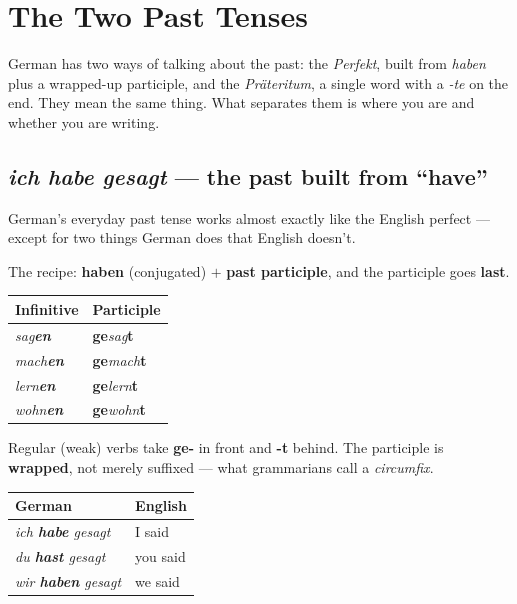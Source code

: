 \chapter{The Two Past Tenses}
\label{ch:perfekt}

German has two ways of talking about the past: the \emph{Perfekt}, built from
\emph{haben} plus a wrapped-up participle, and the \emph{Pr\"{a}teritum}, a
single word with a \emph{-te} on the end. They mean the same thing. What
separates them is where you are and whether you are writing.

\section{\emph{ich habe gesagt} --- the past built from ``have''}
\label{lesson:perfekt}

German's everyday past tense works almost exactly like the English perfect ---
except for two things German does that English doesn't.

\begin{morphologybox}
The recipe: \textbf{haben} (conjugated) $+$ \textbf{past participle}, and the
participle goes \textbf{last}.
\end{morphologybox}

\begin{center}
\begin{tabular}{@{}ll@{}}
\toprule
Infinitive & Participle \\
\midrule
\emph{sag\textbf{en}} & \textbf{ge}\emph{sag}\textbf{t} \\
\emph{mach\textbf{en}} & \textbf{ge}\emph{mach}\textbf{t} \\
\emph{lern\textbf{en}} & \textbf{ge}\emph{lern}\textbf{t} \\
\emph{wohn\textbf{en}} & \textbf{ge}\emph{wohn}\textbf{t} \\
\bottomrule
\end{tabular}
\end{center}

Regular (weak) verbs take \textbf{ge-} in front and \textbf{-t} behind. The
participle is \textbf{wrapped}, not merely suffixed --- what grammarians call a
\emph{circumfix}.

\begin{center}
\begin{tabular}{@{}ll@{}}
\toprule
German & English \\
\midrule
\emph{ich \textbf{habe} gesagt} & I said \\
\emph{du \textbf{hast} gesagt} & you said \\
\emph{wir \textbf{haben} gesagt} & we said \\
\bottomrule
\end{tabular}
\end{center}

